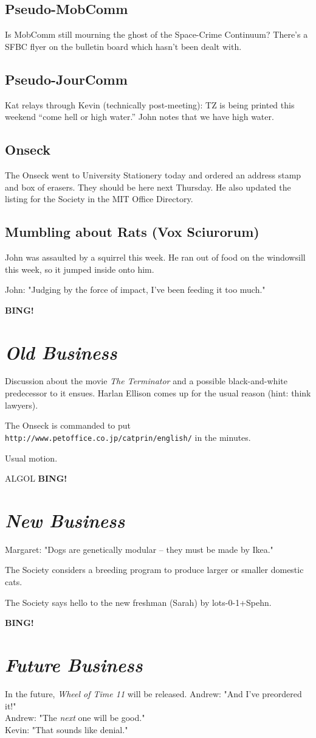 \documentclass[10pt]{article}
\newcommand{\bing}{{\bf BING!} }
\newcommand{\goto}[1]{\bing \vskip 12pt \section*{{\em{#1}}}}
\begin{document}
\subsection*{Pseudo-MobComm}
Is MobComm still mourning the ghost of the Space-Crime Continuum?  There's a SFBC flyer on
the bulletin board which hasn't been dealt with.

\subsection*{Pseudo-JourComm}
Kat relays through Kevin (technically post-meeting):
TZ is being printed this weekend ``come hell or high water.''
John notes that we have high water.

\subsection*{Onseck}
The Onseck went to University Stationery today and ordered an address stamp and box of erasers.
They should be here next Thursday.  He also updated the listing for the Society in the MIT 
Office Directory.

\subsection*{Mumbling about Rats (Vox Sciurorum)}
John was assaulted by a squirrel this week.  He ran out of food on the windowsill this week, so
it jumped inside onto him.

John: "Judging by the force of impact, I've been feeding it too much."

\goto{Old Business}
Discussion about the movie \emph{The Terminator} and a possible black-and-white predecessor 
to it ensues.  Harlan Ellison comes up for the usual reason (hint: think lawyers).

The Onseck is commanded to put {\tt http://www.petoffice.co.jp/catprin/english/} in the minutes.

Usual motion.

ALGOL
\goto{New Business}
Margaret: "Dogs are genetically modular -- they must be made by Ikea."

The Society considers a breeding program to produce larger or smaller domestic cats.

The Society says hello to the new freshman (Sarah) by lots-0-1+Spehn.

\goto{Future Business}
In the future, \emph{Wheel of Time 11} will be released.  Andrew: "And I've preordered it!"\\
Andrew: "The \emph{next} one will be good."\\
Kevin: "That sounds like denial."
\end{document}
